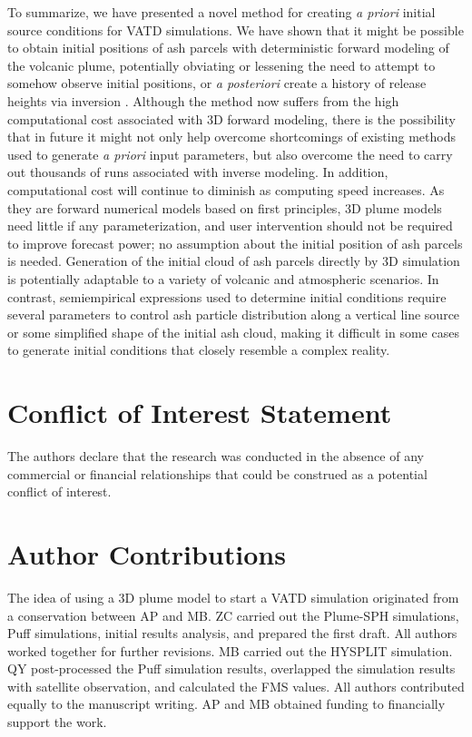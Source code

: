 \documentclass[utf8]{frontiersSCNS} %
\begin{document}
To summarize, we have presented a novel method for creating \textit{a priori} initial source conditions for VATD simulations. We have shown that it might be possible to obtain initial positions of ash parcels with deterministic forward modeling of the volcanic plume, potentially obviating or lessening the need to attempt to somehow observe initial positions, or \textit{a posteriori} create a history of release heights via inversion \citep{stohl2011determination}. Although the method now suffers from the high computational cost associated with 3D forward modeling, there is the possibility that in future it might not only help overcome shortcomings of existing methods used to generate \textit{a priori} input parameters, but also overcome the need to carry out thousands of runs associated with inverse modeling. In addition, computational cost will continue to diminish as computing speed increases. As they are forward numerical models based on first principles, 3D plume models need little if any parameterization, and user intervention should not be required to improve forecast power; no assumption about the initial position of ash parcels is needed. Generation of the initial cloud of ash parcels directly by 3D simulation is potentially adaptable to a variety of volcanic and atmospheric scenarios. In contrast, semiempirical expressions used to determine initial conditions require several parameters to control ash particle distribution along a vertical line source or some simplified shape of the initial ash cloud, making it difficult in some cases to generate initial conditions that closely resemble a complex reality. 

\section*{Conflict of Interest Statement}

The authors declare that the research was conducted in the absence of any commercial or financial relationships that could be construed as a potential conflict of interest.

\section*{Author Contributions}
The idea of using a 3D plume model to start a VATD simulation originated from a conservation between AP and MB. ZC carried out the Plume-SPH simulations, Puff simulations, initial results analysis, and prepared the first draft. All authors worked together for further revisions.  MB carried out the HYSPLIT simulation. QY post-processed the Puff simulation results, overlapped the simulation results with satellite observation, and calculated the FMS values. All authors contributed equally to the manuscript writing. AP and MB obtained funding to financially support the work.
\end{document}
